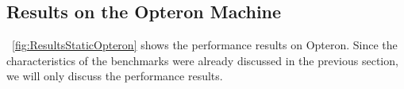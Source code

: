 \subsection{Results on the Opteron Machine}

\figurename~\ref{fig:ResultsStaticOpteron} shows the performance results on Opteron. Since the characteristics of the benchmarks were already discussed in the previous section, we will only discuss the performance results.

\begin{figure}[!tb]
	\centering
	\subfigure{
}
\end{figure}
